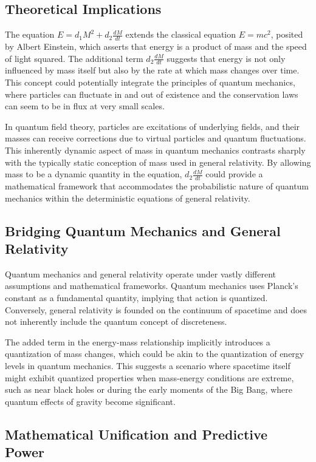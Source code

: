 \documentclass{article}
\begin{document}
\subsection*{Theoretical Implications}

The equation \(E = d_1 M^2 + d_2 \frac{dM}{dt}\) extends the classical equation \(E = mc^2\), posited by Albert Einstein, which asserts that energy is a product of mass and the speed of light squared. The additional term \(d_2 \frac{dM}{dt}\) suggests that energy is not only influenced by mass itself but also by the rate at which mass changes over time. This concept could potentially integrate the principles of quantum mechanics, where particles can fluctuate in and out of existence and the conservation laws can seem to be in flux at very small scales.

In quantum field theory, particles are excitations of underlying fields, and their masses can receive corrections due to virtual particles and quantum fluctuations. This inherently dynamic aspect of mass in quantum mechanics contrasts sharply with the typically static conception of mass used in general relativity. By allowing mass to be a dynamic quantity in the equation, \(d_2 \frac{dM}{dt}\) could provide a mathematical framework that accommodates the probabilistic nature of quantum mechanics within the deterministic equations of general relativity.

\subsection*{Bridging Quantum Mechanics and General Relativity}

Quantum mechanics and general relativity operate under vastly different assumptions and mathematical frameworks. Quantum mechanics uses Planck's constant as a fundamental quantity, implying that action is quantized. Conversely, general relativity is founded on the continuum of spacetime and does not inherently include the quantum concept of discreteness.

The added term in the energy-mass relationship implicitly introduces a quantization of mass changes, which could be akin to the quantization of energy levels in quantum mechanics. This suggests a scenario where spacetime itself might exhibit quantized properties when mass-energy conditions are extreme, such as near black holes or during the early moments of the Big Bang, where quantum effects of gravity become significant.

\subsection*{Mathematical Unification and Predictive Power}
\end{document}
